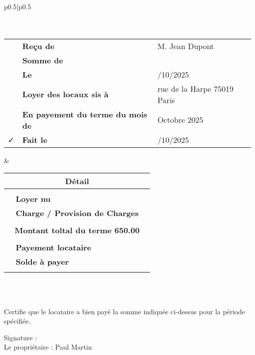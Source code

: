 \documentclass{article}
\begin{document}
\begin{tabular}{p{}|p{}}
	\hline 	
	\\
		\\
	\hline 
	\\
	\begin{tabular}{c>{\raggedleft\arraybackslash}p{}>{\raggedright\arraybackslash}p{}}
		\faFile{} &  \textbf{Reçu de} & M. Jean Dupont\\
		\faMoney & 	\textbf{Somme de}	 & 650.00 \EURdig\\
		\faCalendar & \textbf{Le} & 06/10/2025\\
		\faMapMarker & \textbf{Loyer des locaux sis à } & 6 rue de la Harpe 75019 Paris\\
		\faPencil & \textbf{En payement du terme du mois de} & Octobre 2025\\
		\faCheck & \textbf{Fait le} & 16/10/2025\\
	\end{tabular}
	& \setlength{\arrayrulewidth}{2pt} %
	\begin{tabular}{c>{\raggedleft\arraybackslash}p{}>{\raggedright\arraybackslash}p{}}	
		\multicolumn{3}{c}{\bf Détail}\\
		\hline \\
		\faHome{} & \textbf{Loyer nu} & 580.0 \EURdig	\\
		\faBolt{} & \textbf{Charge / Provision de Charges} &  70.0 \EURdig	\\
		\\
		\multicolumn{3}{c}{\bf Montant toltal du terme 650.00 \EURdig }\\
		\hline \\
		\faMoney{} & \textbf{Payement locataire} & 600.00 \EURdig	\\
		\faExclamationTriangle{} & \textbf{Solde à payer} &  50.00 \EURdig	\\
		&\\
	\end{tabular}\\
	\hline
    \\
    \hline
\end{tabular}






\vspace{1cm}

\noindent
Certifie que le locataire a bien payé la somme indiquée ci-dessus pour la période spécifiée.

\vspace{2cm}

\noindent
Signature : \\
Le propriétaire : Paul Martin
\end{document}
